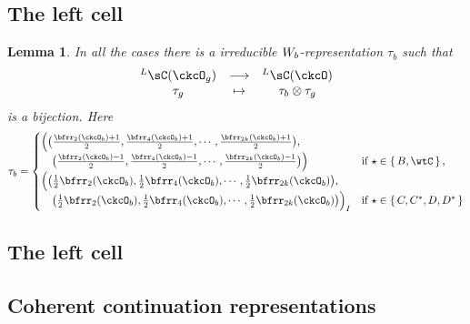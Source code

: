 \documentclass[12pt,a4paper]{amsart}
\def\abs#1{\left|{#1}\right|}
\numberwithin{equation}{section}
\newtheorem{lem}[thm]{Lemma}
\theoremstyle{remark}
\def\half{{\tfrac{1}{2}}}
\def\WLamck{W_{[\lambda_{\ckcO}]}}
\def\LC{{}^L\sC}
\begin{document}
  \subsection{The left cell}

\begin{lem}\label{lem:Lcell}
  In all the cases there is a irreducible $W_{b}$-representation $\tau_{b}$
  such that
  \[
    \begin{array}{ccc}
      \LC(\ckcO_{g}) & \longrightarrow & \LC(\ckcO)\\
      \tau_g & \mapsto & \tau_{b}\otimes \tau_{g}
    \end{array}
  \]
  is a bijection.
  Here
  \[
    \tau_{b} = \begin{cases}
      \Big( \big(\frac{\bfrr_{2}(\ckcO_{b})+1}{2}, \frac{\bfrr_{4}(\ckcO_{b})+1}{2}, \cdots, \frac{\bfrr_{2k}(\ckcO_{b})+1}{2}\big),\\
       \hspace{1em} \big(\frac{\bfrr_{2}(\ckcO_{b})-1}{2}, \frac{\bfrr_{4}(\ckcO_{b})-1}{2}, \cdots, \frac{\bfrr_{2k}(\ckcO_{b})-1}{2}\big)\Big)
      & \text{if } \star \in \set{B,\wtC},\\
      \Big( \big(\half\bfrr_{2}(\ckcO_{b}), \half\bfrr_{4}(\ckcO_{b}),\cdots, \half\bfrr_{2k}(\ckcO_{b})\big), \\
      \hspace{1em} \big(\half\bfrr_{2}(\ckcO_{b}), \half\bfrr_{4}(\ckcO_{b}),\cdots, \half\bfrr_{2k}(\ckcO_{b}) \big)\Big)_{I}
      & \text{if } \star \in \set{C,C^{*}, D,D^{*}}\\
    \end{cases}
  \]


\end{lem}

\subsection{The left cell}



\subsection{Coherent continuation representations}
\end{document}
